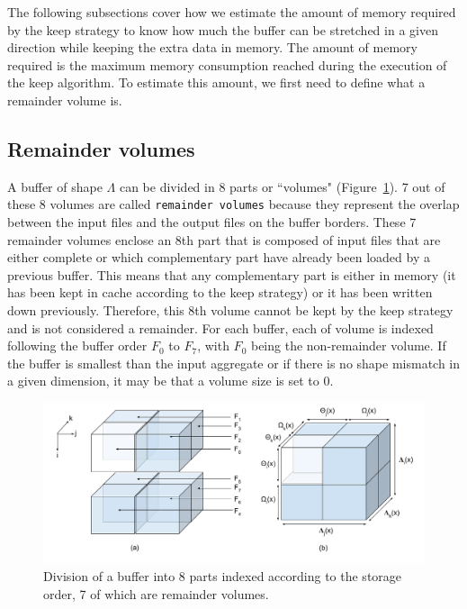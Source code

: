 \documentclass[conference]{IEEEtran}
\begin{document}
The following subsections cover how we estimate the amount of memory required
by the keep strategy to know how much the buffer can be stretched in a given
direction while keeping the extra data in memory. The amount of memory required
is the maximum memory consumption reached during the execution of the keep algorithm.
To estimate this amount, we first need to define what a remainder volume is.

\subsection{Remainder volumes}

A buffer of shape $\Lambda$ can be divided in
8 parts or ``volumes" (Figure~\ref{fig:nomenclature_overlaps}).
7 out of these 8 volumes are called \texttt{remainder volumes} because
they represent the overlap between the input files and the output files on
the buffer borders. These 7 remainder volumes enclose an 8th part that is composed of
input files that are either complete or which complementary part have already
been loaded by a previous buffer. This means that any complementary part is either
in memory (it has been kept in cache according to the keep strategy) or it has
been written down previously. Therefore, this 8th volume cannot be kept by the
keep strategy and is not considered a remainder. For each buffer, each of volume
is indexed following the buffer order $F_0$ to $F_7$, with $F_0$ being the
non-remainder volume. If the buffer is smallest than the input aggregate or if
there is no shape mismatch in a given dimension, it may be that a volume size
is set to 0.

\begin{figure}[h]
\centering
\includegraphics[scale=0.4]{./figures/new/nomenclature_overlaps.png}
\caption{Division of a buffer into 8 parts indexed according to the storage
order, 7 of which are remainder volumes.}
\label{fig:nomenclature_overlaps}
\end{figure}
\end{document}
